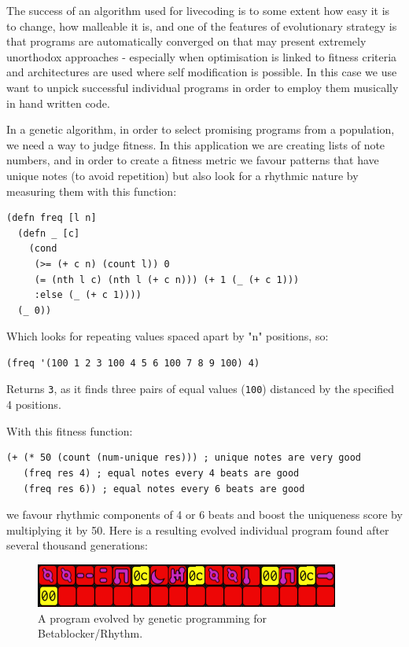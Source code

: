 \documentclass[letterpaper, 12pt]{article}
\begin{document}
The success of an algorithm used for livecoding is to some extent how easy it is to change, how malleable it is, and one of the features of evolutionary strategy is that programs are automatically converged on that may present extremely unorthodox approaches - especially when optimisation is linked to fitness criteria and architectures are used where self modification is possible. In this case we use want to unpick successful individual programs in order to employ them musically in hand written code.

In a genetic algorithm, in order to select promising programs from a population, we need a way to judge fitness. In this application we are creating lists of note numbers, and in order to create a fitness metric we favour patterns that have unique notes (to avoid repetition) but also look for a rhythmic nature by measuring them with this function:

\begin{Verbatim}[fontfamily=courier, xleftmargin=\parindent]
(defn freq [l n]
  (defn _ [c]
    (cond
     (>= (+ c n) (count l)) 0
     (= (nth l c) (nth l (+ c n))) (+ 1 (_ (+ c 1)))
     :else (_ (+ c 1))))
  (_ 0))
\end{Verbatim}

Which looks for repeating values spaced apart by "n" positions, so:

\begin{Verbatim}[fontfamily=courier, xleftmargin=\parindent]
(freq '(100 1 2 3 100 4 5 6 100 7 8 9 100) 4) 
\end{Verbatim}

Returns \texttt{3}, as it finds three pairs of equal values (\texttt{100}) distanced by the specified 4 positions.

With this fitness function:
\begin{Verbatim}[fontfamily=courier, xleftmargin=\parindent]
(+ (* 50 (count (num-unique res))) ; unique notes are very good
   (freq res 4) ; equal notes every 4 beats are good
   (freq res 6)) ; equal notes every 6 beats are good
\end{Verbatim}
we favour rhythmic components of 4 or 6 beats and boost the uniqueness score by multiplying it by 50. Here is a resulting evolved individual program found after several thousand generations:

\begin{figure}[H]
	\centering
		\includegraphics[width=10cm]{evolved}
	\caption{A program evolved by genetic programming for Betablocker/Rhythm.}
	\label{fig:evolved}
\end{figure}
\end{document}
